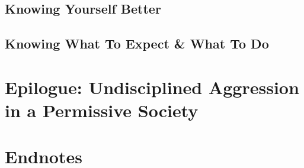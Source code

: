 \documentclass{article}
\numberwithin{equation}{section}
\begin{document}
\subsection{Knowing Yourself Better}

\subsection{Knowing What To Expect \& What To Do}


\section{Epilogue: Undisciplined Aggression in a Permissive Society}


\section{Endnotes}


\printbibliography[heading=bibintoc]
	
\end{document}
